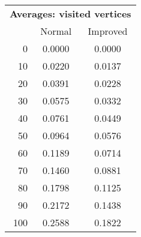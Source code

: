 \begin{tabular}{r|cc}
      \multicolumn{3}{c}{{\bf Averages: visited vertices }} \\
      & Normal & Improved \\ \hline\hline
0
& 0.0000
& 0.0000
\\
10
& 0.0220
& 0.0137
\\
20
& 0.0391
& 0.0228
\\
30
& 0.0575
& 0.0332
\\
40
& 0.0761
& 0.0449
\\
50
& 0.0964
& 0.0576
\\
60
& 0.1189
& 0.0714
\\
70
& 0.1460
& 0.0881
\\
80
& 0.1798
& 0.1125
\\
90
& 0.2172
& 0.1438
\\
100
& 0.2588
& 0.1822
\\
\end{tabular}
